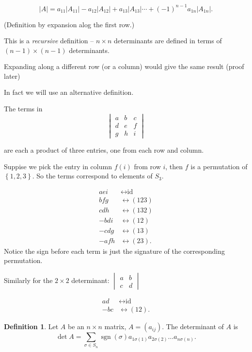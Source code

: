 \documentclass{article}
\theoremstyle{definition}
\newtheorem*{definition}{Definition}
\DeclareMathOperator{\sgn}{sgn}
\begin{document}
\[
  |A| = a_{11}|A_{11}| - a_{12}|A_{12}| + a_{13}|A_{13}| \cdots + (-1)^{n-1}a_{1n}|A_{1n}|.
\]

(Definition by expansion alog the first row.)

This is a \emph{recursive} definition -- $n \times n$ determinants are defined in terms of $(n-1) \times (n-1)$ determinants.

Expanding along a different row (or a column) would give the same result (proof later)


In fact we will use an alternative definition.

The terms in \[
  \begin{vmatrix}
    a & b & c \\
    d & e & f \\
    g & h & i
  \end{vmatrix}
\]

are each a product of three entries, one from each row and column.

Suppise we pick the entry in column $f(i)$ from row $i$, then $f$ is a permutation of $\left\{ 1,2,3 \right\}$. So the terms correspond to elements of $S_3$.

\begin{align*}
  aei &\leftrightarrow \text{id} \\
bfg &\leftrightarrow (123) \\
cdh &\leftrightarrow (132) \\
-bdi &\leftrightarrow (12) \\
-cdg &\leftrightarrow (13) \\
-afh &\leftrightarrow (23).
\end{align*}
Notice the sign before each term is just the signature of the corresponding permutation.

Similarly for the $2 \times 2$ determinant: 
$\begin{vmatrix}a & b \\ c & d\end{vmatrix}$

\begin{align*}
  ad &\leftrightarrow \text{id} \\
  -bc &\leftrightarrow (12).
\end{align*}

\begin{definition}
  Let $A$ be an $n \times n$ matrix, $A = (a_{ij})$. The determinant of $A$ is 
  \[
    \det A = \sum_{\sigma \in S_n} \sgn(\sigma) a_{1\sigma(1)}a_{2\sigma (2)}\dots a_{n \sigma (n)}.
  \]
\end{definition}
\end{document}
